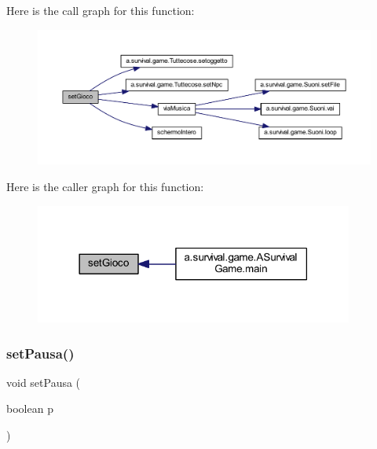 Here is the call graph for this function\+:
\nopagebreak
\begin{figure}[H]
\begin{center}
\leavevmode
\includegraphics[width=350pt]{classa_1_1survival_1_1game_1_1_pannello_a656b18ea5779c5d29c83a5abea629534_cgraph}
\end{center}
\end{figure}
Here is the caller graph for this function\+:
\nopagebreak
\begin{figure}[H]
\begin{center}
\leavevmode
\includegraphics[width=297pt]{classa_1_1survival_1_1game_1_1_pannello_a656b18ea5779c5d29c83a5abea629534_icgraph}
\end{center}
\end{figure}
\mbox{\label{classa_1_1survival_1_1game_1_1_pannello_a2283a8c1211827155404ab0ccb5c65c4}} 
\subsubsection{\texorpdfstring{set\+Pausa()}{setPausa()}}
{\footnotesize\ttfamily void set\+Pausa (\begin{DoxyParamCaption}\item[{boolean}]{p }\end{DoxyParamCaption})}



